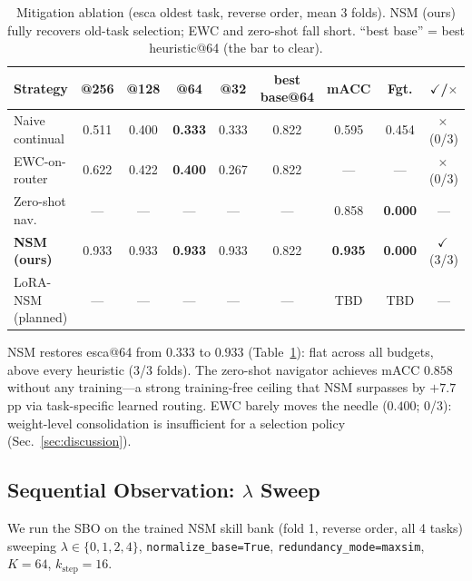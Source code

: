 \documentclass[runningheads]{llncs}
\newcommand{\go}{\ensuremath{\checkmark}}
\newcommand{\nogo}{\ensuremath{\times}}
\begin{document}
\begin{table}[htbp]
\centering
\caption{Mitigation ablation (esca oldest task, reverse order, mean 3 folds).
NSM (ours) fully recovers old-task selection; EWC and zero-shot fall
short. ``best base'' = best heuristic@64 (the bar to clear).}
\label{tab:mitigation}
\small\begin{tabular}{lcccccccc}
\toprule
Strategy & @256 & @128 & @64 & @32 & best base@64 & mACC & Fgt. & \go/\nogo \\
\midrule
Naive continual  & 0.511 & 0.400 & \textbf{0.333} & 0.333 & 0.822 & 0.595 & 0.454 & \nogo\,(0/3) \\
EWC-on-router    & 0.622 & 0.422 & \textbf{0.400} & 0.267 & 0.822 & ---   & ---   & \nogo\,(0/3) \\
Zero-shot nav.~\cite{zeroslide}
                 & ---   & ---   & ---            & ---   & ---   & 0.858 & \textbf{0.000} & --- \\
\textbf{NSM (ours)}
                 & 0.933 & 0.933 & \textbf{0.933} & 0.933 & 0.822 & \textbf{0.935} & \textbf{0.000} & \go\,(3/3) \\
\midrule
LoRA-NSM (planned) & --- & --- & --- & --- & --- & TBD & TBD & --- \\
\bottomrule
\end{tabular}
\end{table}

NSM restores esca@64 from $0.333$ to $\mathbf{0.933}$ (Table~\ref{tab:mitigation}):
flat across all budgets, above every heuristic (3/3 folds). The
zero-shot navigator achieves mACC $0.858$ without any training---a
strong training-free ceiling that NSM surpasses by $+7.7$\,pp via
task-specific learned routing. EWC barely moves the needle ($0.400$;
0/3): weight-level consolidation is insufficient for a selection
policy (Sec.~\ref{sec:discussion}).

\subsection{Sequential Observation: $\lambda$ Sweep}
\label{sec:lambda}

We run the SBO on the trained NSM skill bank (fold 1, reverse order,
all 4 tasks) sweeping $\lambda\in\{0,1,2,4\}$, \texttt{normalize\_base=True},
\texttt{redundancy\_mode=maxsim}, $K{=}64$, $k_\text{step}{=}16$.
\end{document}
